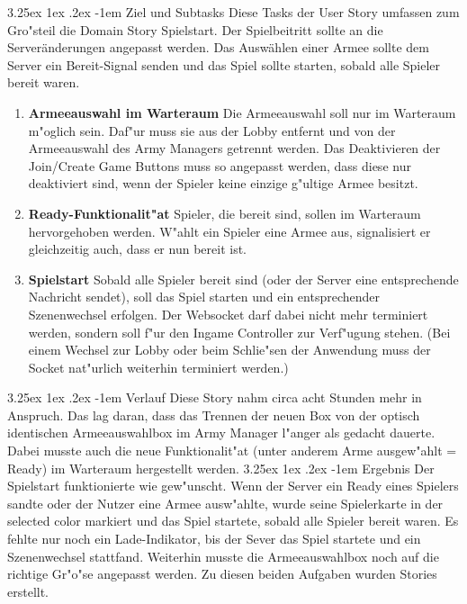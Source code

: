\documentclass[12pt, titlepage]{scrartcl}
\makeatletter
\renewcommand\paragraph{\@startsection{paragraph}{5}{\z@}%
  {3.25ex \@plus1ex \@minus.2ex}%
  {-1em}%
  {\normalfont\normalsize\bfseries}}
\makeatother
\begin{document}
	            \paragraph{Ziel und Subtasks}
		         		Diese Tasks der User Story umfassen zum Gro"steil die Domain Story Spielstart. Der Spielbeitritt sollte an die Server\"anderungen angepasst werden. Das Ausw\"ahlen einer Armee sollte dem Server ein Bereit-Signal senden und das Spiel sollte starten, sobald alle Spieler bereit waren.
	                	\begin{enumerate}[label={}]
		                	\item \textbf{Armeeauswahl im Warteraum} \hspace{5pt} Die Armeeauswahl soll nur im Warteraum m"oglich sein. Daf"ur muss sie aus der Lobby entfernt und von der Armeeauswahl des Army Managers getrennt werden. Das Deaktivieren der Join/Create Game Buttons muss so angepasst werden, dass diese nur deaktiviert sind, wenn der Spieler keine einzige g"ultige Armee besitzt.
		                	\item \textbf{Ready-Funktionalit"at} \hspace{5pt} Spieler, die bereit sind, sollen im Warteraum hervorgehoben werden. W"ahlt ein Spieler eine Armee aus, signalisiert er gleichzeitig auch, dass er nun bereit ist.
		                	\item \textbf{Spielstart} \hspace{5pt} Sobald alle Spieler bereit sind (oder der Server eine entsprechende Nachricht sendet), soll das Spiel starten und ein entsprechender Szenenwechsel erfolgen. Der Websocket darf dabei nicht mehr terminiert werden, sondern soll f"ur den Ingame Controller zur Verf"ugung stehen. (Bei einem Wechsel zur Lobby oder beim Schlie"sen der Anwendung muss der Socket nat"urlich weiterhin terminiert werden.)
	                \end{enumerate}
                \paragraph{Verlauf}
                	Diese Story nahm circa acht Stunden mehr in Anspruch. Das lag daran, dass das Trennen der neuen Box von der optisch identischen Armeeauswahlbox im Army Manager l"anger als gedacht dauerte. Dabei musste auch die neue Funktionalit"at (unter anderem Arme ausgew"ahlt = Ready) im Warteraum hergestellt werden.
                \paragraph{Ergebnis}
                	Der Spielstart funktionierte wie gew"unscht. Wenn der Server ein Ready eines Spielers sandte oder der Nutzer eine Armee ausw"ahlte, wurde seine Spielerkarte in der selected color markiert und das Spiel startete, sobald alle Spieler bereit waren. Es fehlte nur noch ein Lade-Indikator, bis der Sever das Spiel startete und ein Szenenwechsel stattfand. Weiterhin musste die Armeeauswahlbox noch auf die richtige Gr"o"se angepasst werden. Zu diesen beiden Aufgaben wurden Stories erstellt.
\end{document}
